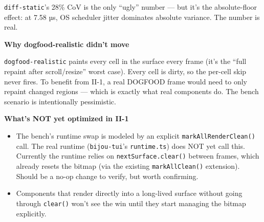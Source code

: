\texttt{d\allowbreak{}i\allowbreak{}f\allowbreak{}f\allowbreak{}-\allowbreak{}s\allowbreak{}t\allowbreak{}a\allowbreak{}t\allowbreak{}i\allowbreak{}c}'s 28\% CoV is the only ``ugly'' number --- but it's the absolute-floor effect: at 7.58 µs, OS scheduler jitter dominates absolute variance. The number is real.

\textbf{Why dogfood-realistic didn't move}

\texttt{d\allowbreak{}o\allowbreak{}g\allowbreak{}f\allowbreak{}o\allowbreak{}o\allowbreak{}d\allowbreak{}-\allowbreak{}r\allowbreak{}e\allowbreak{}a\allowbreak{}l\allowbreak{}i\allowbreak{}s\allowbreak{}t\allowbreak{}i\allowbreak{}c} paints every cell in the surface every frame (it's the ``full repaint after scroll/resize'' worst case). Every cell is dirty, so the per-cell skip never fires. To benefit from II-1, a real DOGFOOD frame would need to only repaint changed regions --- which is exactly what real components do. The bench scenario is intentionally pessimistic.

\textbf{What's NOT yet optimized in II-1}

\begin{itemize}
\tightlist
\item
  The bench's runtime swap is modeled by an explicit \texttt{m\allowbreak{}a\allowbreak{}r\allowbreak{}k\allowbreak{}A\allowbreak{}l\allowbreak{}l\allowbreak{}R\allowbreak{}e\allowbreak{}n\allowbreak{}d\allowbreak{}e\allowbreak{}r\allowbreak{}C\allowbreak{}l\allowbreak{}e\allowbreak{}a\allowbreak{}n\allowbreak{}(\allowbreak{})} call. The real runtime (\texttt{b\allowbreak{}i\allowbreak{}j\allowbreak{}o\allowbreak{}u\allowbreak{}-\allowbreak{}t\allowbreak{}u\allowbreak{}i}'s \texttt{r\allowbreak{}u\allowbreak{}n\allowbreak{}t\allowbreak{}i\allowbreak{}m\allowbreak{}e\allowbreak{}.\allowbreak{}t\allowbreak{}s}) does NOT yet call this. Currently the runtime relies on \texttt{n\allowbreak{}e\allowbreak{}x\allowbreak{}t\allowbreak{}S\allowbreak{}u\allowbreak{}r\allowbreak{}f\allowbreak{}a\allowbreak{}c\allowbreak{}e\allowbreak{}.\allowbreak{}c\allowbreak{}l\allowbreak{}e\allowbreak{}a\allowbreak{}r\allowbreak{}(\allowbreak{})} between frames, which already resets the bitmap (via the existing \texttt{m\allowbreak{}a\allowbreak{}r\allowbreak{}k\allowbreak{}A\allowbreak{}l\allowbreak{}l\allowbreak{}C\allowbreak{}l\allowbreak{}e\allowbreak{}a\allowbreak{}n\allowbreak{}(\allowbreak{})} extension). Should be a no-op change to verify, but worth confirming.
\item
  Components that render directly into a long-lived surface without going through \texttt{c\allowbreak{}l\allowbreak{}e\allowbreak{}a\allowbreak{}r\allowbreak{}(\allowbreak{})} won't see the win until they start managing the bitmap explicitly.
\end{itemize}

